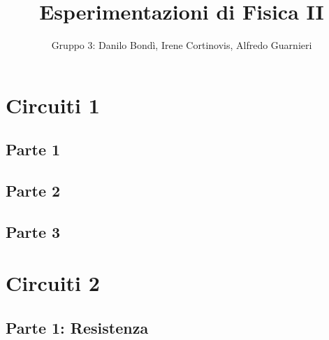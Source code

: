\documentclass[11pt]{article}
\begin{document}
%



\author{Gruppo 3: Danilo Bondì, Irene Cortinovis, Alfredo Guarnieri}
\title{Esperimentazioni di Fisica II}
\maketitle

\tableofcontents\newpage




\section{Circuiti 1}

\subsection{Parte 1 }

\newpage

\subsection{Parte 2 }

\newpage

\subsection{Parte 3 }

\newpage






\section{Circuiti 2}

\subsection{Parte 1: Resistenza}

\newpage
\end{document}
